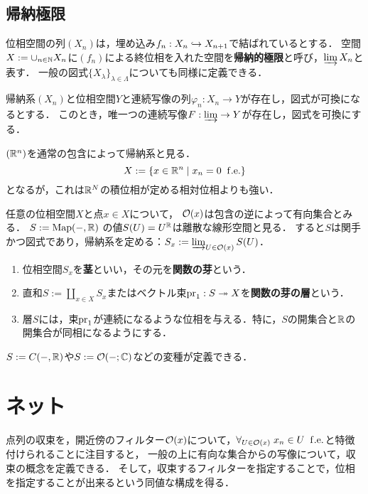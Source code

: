 \documentclass[uplatex,dvipdfmx]{jsreport}
\begin{document}
\subsection{帰納極限}

\begin{definition}
    位相空間の列$(X_n)$は，埋め込み$f_n:X_n\hookrightarrow X_{n+1}$で結ばれているとする．
    空間$X:=\cup_{n\in\mathbb{N}}X_n$に$(f_n)$による終位相を入れた空間を\textbf{帰納的極限}と呼び，$\varinjlim X_n$と表す．
    一般の図式$\{X_\lambda\}_{\lambda\in\Lambda}$についても同様に定義できる．
\end{definition}

\begin{theorem}[帰納極限の普遍性]
    帰納系$(X_n)$と位相空間$Y$と連続写像の列$\varphi_n:X_n\to Y$が存在し，図式が可換になるとする．
    このとき，唯一つの連続写像$F:\varinjlim\to Y$が存在し，図式を可換にする．
\end{theorem}

\begin{example}
    $(\mathbb{R}^n)$を通常の包含によって帰納系と見る．
    \[X:=\left\{x\in\mathbb{R}^n\mid x_n=0\;\;\mathrm{f.e.}\right\}\]
    となるが，これは$\mathbb{R}^N$の積位相が定める相対位相よりも強い．
\end{example}

\begin{example}
    任意の位相空間$X$と点$x\in X$について，
    $\mathcal{O}(x)$は包含の逆によって有向集合とみる．
    $S:=\mathrm{Map}(-,\mathbb{R})$
    の値$S(U)=U^{\mathbb{R}}$は離散な線形空間と見る．
    すると$S$は関手かつ図式であり，帰納系を定める：$S_x:=\varinjlim_{U\in\mathcal{O}(x)}S(U)$．
    \begin{enumerate}
        \item 位相空間$S_x$を\textbf{茎}といい，その元を\textbf{関数の芽}という．
        \item 直和$S:=\coprod_{x\in X}S_x$またはベクトル束$\mathrm{pr}_1:S\twoheadrightarrow X$を\textbf{関数の芽の層}という．
        \item 層$S$には，束$\mathrm{pr}_1$が連続になるような位相を与える．特に，$S$の開集合と$\mathbb{R}$の開集合が同相になるようにする．
    \end{enumerate}
    $S:=C(-,\mathbb{R})$や$S:=\mathcal{O}(-;\mathbb{C})$などの変種が定義できる．
\end{example}

\section{ネット}

\begin{tcolorbox}[colframe=ForestGreen, colback=ForestGreen!10!white,breakable,colbacktitle=ForestGreen!40!white,coltitle=black,fonttitle=\bfseries\sffamily,
title=]
    点列の収束を，開近傍のフィルター$\mathcal{O}(x)$について，$\forall_{U\in\mathcal{O}(x)}\;x_n\in U\;\;\mathrm{f.e.}$と特徴付けられることに注目すると，
    一般の上に有向な集合からの写像について，収束の概念を定義できる．
    そして，収束するフィルターを指定することで，位相を指定することが出来るという同値な構成を得る．
\end{tcolorbox}
\end{document}

